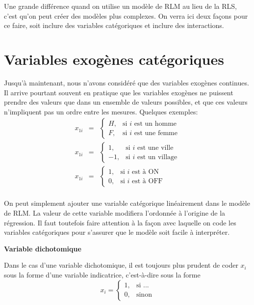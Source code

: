 



Une grande différence quand on utilise un modèle de RLM au lieu de la RLS, c'est qu'on peut créer des modèles plus complexes. On verra ici deux façons pour ce faire, soit inclure des variables catégoriques et inclure des interactions.

\section{Variables exogènes catégoriques}

Jusqu'à maintenant, nous n'avons considéré que des variables
exogènes continues. Il arrive pourtant souvent en pratique que
les variables exogènes ne puissent prendre des valeurs que dans
un ensemble de valeurs possibles, et que ces valeurs n'impliquent
pas un ordre entre les mesures. Quelques exemples:
\begin{eqnarray*}
x_{1i}&=&\left\{\begin{array}{ll} H, & \mbox{si $i$ est un homme}\\
F, & \mbox{si $i$ est une femme}\end{array}\right.\\
x_{1i}&=&\left\{\begin{array}{ll} 1, & \mbox{si $i$ est une ville}\\
-1, & \mbox{si $i$ est un village}\end{array}\right.\\
x_{1i}&=&\left\{\begin{array}{ll}1, & \mbox{si $i$ est à ON}\\
0, & \mbox{si $i$ est à OFF}\end{array}\right.\\
\end{eqnarray*}

On peut simplement ajouter une variable catégorique linéairement dans le modèle de RLM. La valeur de cette variable modifiera l'ordonnée à l'origine de la régression. Il faut toutefois faire attention à la façon avec laquelle on code les variables catégoriques pour s'assurer que le modèle soit facile à interpréter.

\newpage
\textbf{Variable dichotomique}

Dans le cas d'une variable dichotomique, il est toujours plus prudent de coder $x_i$ sous la forme d'une variable indicatrice, c'est-à-dire sous la forme
$$x_i=\left\{\begin{array}{ll} 1, & \mbox{si ...}\\
0, & \mbox{sinon}\end{array}\right.$$

